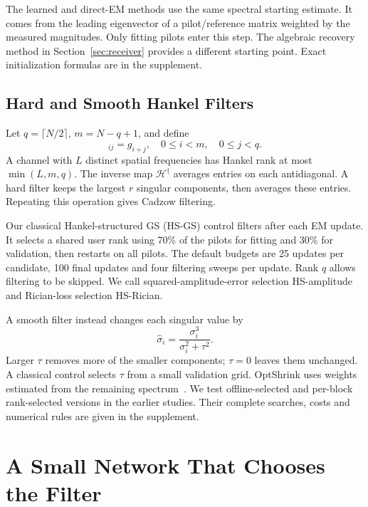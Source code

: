 \documentclass[10pt,journal,letterpaper]{IEEEtran}
\newcommand{\HH}{\mathcal{H}}
\begin{document}
The learned and direct-EM methods use the same spectral starting estimate. It comes from the leading eigenvector of a pilot/reference matrix weighted by the measured magnitudes. Only fitting pilots enter this step. The algebraic recovery method in Section~\ref{sec:receiver} provides a different starting point. Exact initialization formulas are in the supplement.

\subsection{Hard and Smooth Hankel Filters}
Let $q=\lceil N/2\rceil$, $m=N-q+1$, and define
\begin{equation}
 [\HH(g)]_{ij}=g_{i+j},\quad 0\le i<m,\quad0\le j<q.
\end{equation}
A channel with $L$ distinct spatial frequencies has Hankel rank at most $\min(L,m,q)$. The inverse map $\HH^\dagger$ averages entries on each antidiagonal. A hard filter keeps the largest $r$ singular components, then averages these entries. Repeating this operation gives Cadzow filtering.

Our classical Hankel-structured GS (HS-GS) control filters after each EM update. It selects a shared user rank using 70\% of the pilots for fitting and 30\% for validation, then restarts on all pilots. The default budgets are 25 updates per candidate, 100 final updates and four filtering sweeps per update. Rank $q$ allows filtering to be skipped. We call squared-amplitude-error selection HS-amplitude and Rician-loss selection HS-Rician.

A smooth filter instead changes each singular value by
\begin{equation}
 \widehat\sigma_i=\frac{\sigma_i^3}{\sigma_i^2+\tau^2}.
 \label{eq:shrink}
\end{equation}
Larger $\tau$ removes more of the smaller components; $\tau=0$ leaves them unchanged. A classical control selects $\tau$ from a small validation grid. OptShrink uses weights estimated from the remaining spectrum~\cite{nadakuditi2014}. We test offline-selected and per-block rank-selected versions in the earlier studies. Their complete searches, costs and numerical rules are given in the supplement.

\section{A Small Network That Chooses the Filter}
\end{document}
